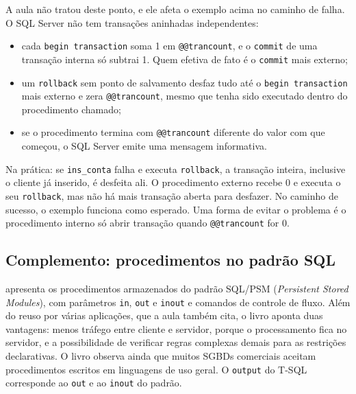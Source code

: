 A aula não tratou deste ponto, e ele afeta o exemplo acima no caminho de
falha. O SQL Server não tem transações aninhadas
independentes:

\begin{itemize}
	\item cada \texttt{begin transaction} soma 1 em
	\texttt{@@trancount}, e o \texttt{commit} de uma transação interna só
	subtrai 1. Quem efetiva de fato é o \texttt{commit} mais externo;
	\item um \texttt{rollback} sem ponto de salvamento desfaz tudo até o
	\texttt{begin transaction} mais externo e zera
	\texttt{@@trancount}, mesmo que tenha sido executado dentro do
	procedimento chamado;
	\item se o procedimento termina com \texttt{@@trancount} diferente do
	valor com que começou, o SQL Server emite uma mensagem informativa.
\end{itemize}

Na prática: se \texttt{ins\_conta} falha e executa \texttt{rollback}, a
transação inteira, inclusive o cliente já inserido, é desfeita ali. O
procedimento externo recebe 0 e executa o seu \texttt{rollback}, mas não
há mais transação aberta para desfazer. No caminho de sucesso, o exemplo
funciona como esperado. Uma forma de evitar o problema é o procedimento
interno só abrir transação quando \texttt{@@trancount} for 0.

\subsection*{Complemento: procedimentos no padrão SQL}

\textcite[seção 13.4]{Elmasri2011} apresenta os procedimentos
armazenados do padrão SQL/PSM (\emph{Persistent Stored Modules}), com
parâmetros \texttt{in}, \texttt{out} e \texttt{inout} e comandos de
controle de fluxo. Além do reuso por várias aplicações, que a aula
também cita, o livro aponta duas vantagens: menos tráfego entre cliente
e servidor, porque o processamento fica no servidor, e a possibilidade
de verificar regras complexas demais para as restrições declarativas. O
livro observa ainda que muitos SGBDs comerciais aceitam procedimentos
escritos em linguagens de uso geral. O \texttt{output} do T-SQL
corresponde ao \texttt{out} e ao \texttt{inout} do padrão.
